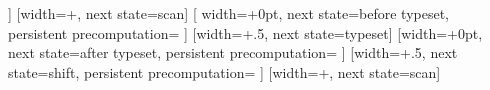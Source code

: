 {{                \fi%
        \fi%
        \let\pgfdecorationrestoftext=\pgfdecorationtext%
    }]{}%
[width=+\pgf@lib@dec@text@indent@left, next state=scan]{}%
%
[
    width=+0pt,
    next state=before typeset,
    persistent precomputation={
        \pgf@lib@dec@text@scanchar%
        \ifvoid\pgf@lib@dec@text@box%
            \setbox\pgf@lib@dec@text@box\hbox{}%
            \wd{}\relax%
        \fi%
}]{}%
%
[width=+.5\wd\pgf@lib@dec@text@box, next state=typeset]{}%
%
[width=+0pt, next state=after typeset,
  persistent precomputation={
    \iftikz@lib@dec@te@yvecispoint
      \pgfmathanglebetweenpoints%
      {\pgfpointlineatdistance{\pgfdecoratedinputsegmentcompleteddistance}{\pgf@decorate@inputsegment@first}{\pgf@decorate@inputsegment@last}}%
      {\tikz@lib@dec@te@yvecendpoint}%
      \edef\tikz@lib@dec@te@yvecangle{\pgfmathresult}
    \fi
  }
]
{%
  \pgftransformxshift{+-.5\wd\pgf@lib@dec@text@box}%
  \setbox\pgf@hbox\hbox{\copy\pgf@lib@dec@text@box}%
  \pgftransformtriangle%
  {}%
  {}%
  {}%
  \tikz@checkunit{\tikz@lib@dec@te@threedimraise}%
  \iftikz@isdimension%
    \pgftransformshift{\pgfpoint{0pt}{\tikz@lib@dec@te@threedimraise}}%
  \else%
  \fi%
  \pgfqboxsynced\pgf@hbox%
}%
[width=+.5\wd\pgf@lib@dec@text@box, next state=shift,
    persistent precomputation={%
    \ifpgf@lib@dec@text@fit%
        \ifpgf@lib@dec@text@stretch@spaces%
            \ifpgf@lib@dec@text@scan@space%
                \let\pgf@lib@dec@text@shift=\pgf@lib@dec@text@space@shift%
            \else%
                \def\pgf@lib@dec@text@shift{0pt}%
            \fi%
        \else%
            \let\pgf@lib@dec@text@shift=\pgf@lib@dec@text@character@shift%
          \fi%
        \else%
            \def\pgf@lib@dec@text@shift{0pt}%
      \fi%
  }]{}%
[width=+\pgf@lib@dec@text@shift, next state=scan]{}%
%
}%


%
\def\tikz@lib@dec@te@parse@stylecharacters#1#2{%
  \def\tikz@lib@dec@te@text{#1}%
  \tikz@lib@dec@te@scancharacters{%
    \pgfkeysalso{/pgf/decoration/text effects/character {\meaning\tikz@lib@dec@te@character}/.style={#2}}%
  }%
}%

%
\def\tikz@lib@dec@te@parse@replacecharacters#1#2{%
  \def\tikz@lib@dec@te@text{#1}%
  \tikz@lib@dec@te@scancharacters{%
    \expandafter\def\csname tikz@lib@dec@te@character@replacements@\meaning\tikz@lib@dec@te@character @code\endcsname{#2}%
  }%
}%

\endinput
